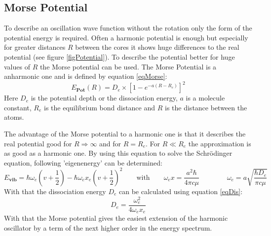 \subsection{Morse Potential}
To describe an oscillation wave function without the rotation only the form of the potential energy is required. Often a harmonic potential is enough but especially for greater distances $R$ between the cores it shows huge differences to the real potential (see figure \ref{figPotential}). To describe the potential better for huge values of $R$ the Morse potential can be used. 
The Morse Potential is a anharmonic one and is defined by equation \ref{eqMorse}:
\begin{equation}
	E_{\textbf{Pot}}(R)=D_e\times[1-e^{-a(R-R_e)}]^2
	\label{eqMorse}
\end{equation}
Here $D_e$ is the potential depth or the dissociation energy, $a$ is a molecule constant, $R_e$ is the equilibrium bond distance and $R$ is the distance between the atoms.\par
The advantage of the Morse potential to a harmonic one is that it describes the real potential good for $R\Rightarrow \infty$ and for $R=R_e$. For $R\ll R_e$ the approximation is as good as a harmonic one. By using this equation to solve the Schrödinger equation, following 'eigenenergy' can be determined:
\begin{equation}
E_{\textbf{vib}}=\hbar \omega_e\left(v+\frac{1}{2}\right)-\hbar 	\omega_ex_e\left(v+\frac{1}{2}\right)^2 \qquad \text{with} \qquad \omega_ex=\frac{a^2\hbar}{4\pi c \mu} \qquad \qquad \omega_e=a\sqrt{\frac{\hbar D_e}{\pi c\mu}}
\end{equation}
With that the dissociation energy $D_e$ can be calculated using equation \ref{eqDis}:
\begin{equation}
	D_e=\frac{\omega_e^2}{4\omega_ex_e}
	\label{eqDis}
\end{equation}
With that the Morse potential gives the easiest extension of the harmonic oscillator by a term of the next higher order in the energy spectrum.

